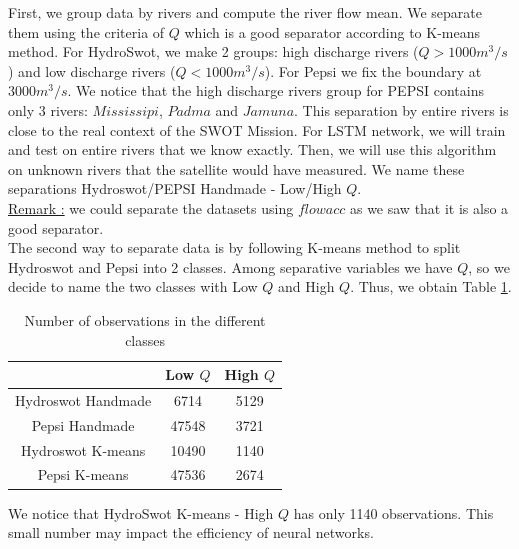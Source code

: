 First, we group data by rivers and compute the river flow mean. We separate them using the criteria of $Q$ which is a good separator according to K-means method. For HydroSwot, we make 2 groups: high discharge rivers ($Q > 1000 m^3/s$) and low discharge rivers ($Q < 1000 m^3/s$). For Pepsi we fix the boundary at $3000 m^3/s$. We notice that the high discharge rivers group for PEPSI contains only 3 rivers: $Mississipi$, $Padma$ and $Jamuna$. This separation by entire rivers is close to the real context of the SWOT Mission. For LSTM network, we will train and test on entire rivers that we know exactly. Then, we will use this algorithm on unknown rivers that the satellite would have measured. We name these separations Hydroswot/PEPSI Handmade - Low/High $Q$.\\

\underline{Remark :} we could separate the datasets using $flowacc$ as we saw that it is also a good separator. \\
The second way to separate data is by following K-means method to split Hydroswot and Pepsi into 2 classes. Among separative variables we have $Q$, so we decide to name the two classes with Low $Q$ and High $Q$. Thus, we obtain Table \ref{Tab:class_prop}.

\begin{table}[H]
\centering
    \begin{tabular}{|c|c|c|}
    \hline
    & Low $Q$ & High $Q$ \\ \hline
    Hydroswot Handmade & 6714 & 5129 \\\hline
    Pepsi Handmade & 47548 & 3721 \\\hline
    Hydroswot K-means  &  10490 & 1140 \\\hline
    Pepsi K-means & 47536 & 2674\\ \hline
    \end{tabular}
\caption{Number of observations in the different classes}
\label{Tab:class_prop}
\end{table}

We notice that HydroSwot K-means - High $Q$ has only 1140 observations. This small number may impact the efficiency of neural networks.